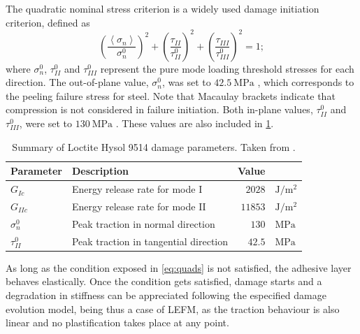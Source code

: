 \documentclass[
documentsize = a4, %
font = cmr, %
typesize = 11, %
printmode = true,
onehalfspacing = true,
language = en, %
titlepage = udciccp, %
degree = pt, %
dedication = true,
acknowledgements = true,
abstract-en = true,
abstract-es = false,
abstract-ga = false,
epigraphs = true,
toc = true,
lof = true,
lot = true,
frontmatterintoc = false,
notation = false,
minimal = false,
]{UDCthesis}
\begin{document}
The quadratic nominal stress criterion is a widely used damage initiation criterion, defined as
\begin{equation}
\left(\frac{\left<\sigma_{n}\right>}{\sigma_{n}^{0}}\right)^{2} + \left(\frac{\tau_{II}}{\tau_{II}^{0}}\right)^{2} + \left(\frac{\tau_{III}}{\tau_{III}^{0}}\right)^{2} = 1 ;
\label{eq:quads}
\end{equation}
where $\sigma_{n}^{0}$, $\tau_{II}^{0}$ and $\tau_{III}^{0}$ represent the pure mode loading threshold stresses for each direction. The out-of-plane value, $\sigma_{n}^{0}$, was set to $\SI{42.5}{\MPa}$ \citep{Scattina2011}, which corresponds to the peeling failure stress for steel. Note that Macaulay brackets indicate that compression is not considered in failure initiation. Both in-plane values, $\tau_{II}^{0}$ and $\tau_{III}^{0}$, were set to $\SI{130}{\MPa}$ \citep{Scattina2011}. These values are also included in \cref{tab:ads_dmg_params}. %

\begin{table}
	\centering
	\begin{tabular}{llrl}

		\toprule

		Parameter & Description & Value & \\

		\midrule

		$G_{Ic}$ & Energy release rate for mode I & $\num{2028}$ & $\si{\J/\m^2}$ \\
		$G_{IIc}$ & Energy release rate for mode II & $\num{11853}$ & $\si{\J/\m^2}$ \\
		$\sigma_{n}^{0}$ & Peak traction in normal direction & $\num{130}$ & $\si{\MPa}$ \\
		$\tau_{II}^{0}$ & Peak traction in tangential direction & $\num{42.5}$ & $\si{\MPa}$ \\

		\bottomrule

	\end{tabular}
	\caption[Summary of Loctite Hysol 9514 damage parameters.]{Summary of Loctite Hysol 9514 damage parameters. Taken from \citet{Scattina2011}.}
	\label{tab:ads_dmg_params}
\end{table}

As long as the condition exposed in \cref{eq:quads} is not satisfied, the adhesive layer behaves elastically. Once the condition gets satisfied, damage starts and a degradation in stiffness can be appreciated following the especified damage evolution model, being thus a case of \gls{LEFM}, as the traction behaviour is also linear and no plastification takes place at any point.
\end{document}
